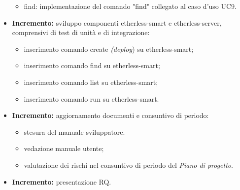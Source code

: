 \begin{itemize}
\begin{itemize}
    \item find: implementazione del comando "find" collegato al caso d'uso UC9.
  \end{itemize}
	\item \textbf{ Incremento:} sviluppo componenti etherless-smart e etherless-server, comprensivi di test di unità e di integrazione:
	\begin{itemize}
		\item inserimento comando create \textit{(deploy}\glo) su etherless-smart;
		\item inserimento comando find su etherless-smart;
		\item inserimento comando list su etherless-smart;
		\item inserimento comando run su etherless-smart.
	\end{itemize}
	\item \textbf{ Incremento:} aggiornamento documenti e consuntivo di periodo:
  \begin{itemize}
  	\item stesura del manuale sviluppatore.
    \item vedazione manuale utente;
    \item valutazione dei rischi nel consuntivo di periodo del \textit{Piano di progetto}\docs.
  \end{itemize}
	\item \textbf{ Incremento:} presentazione RQ.
\end{itemize}
